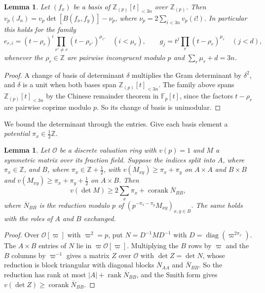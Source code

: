 \documentclass[11pt]{amsart}
\newtheorem{lemma}[theorem]{Lemma}
\theoremstyle{definition}
\theoremstyle{remark}
\numberwithin{equation}{section}
\newcommand{\Z}{\mathbb Z}
\newcommand{\F}{\mathbb F}
\newcommand{\cO}{\mathcal O}
\begin{document}
\begin{lemma}\label{lem:gram}
Let $(f_x)$ be a basis of $\Z_{(p)}[t]_{<3n}$ over $\Z_{(p)}$. Then
$v_p(J_n)=v_p\det[B(f_x,f_y)]-\nu_p$, where $\nu_p=2\sum_{i<3n}v_p(i!)$. In particular this holds for
the family
\[
 e_{r,i}=(t-\rho_r)^i\prod_{r'\ne r}(t-\rho_{r'})^{\mu_{r'}}\quad(i<\mu_r),\qquad g_j=t^j\prod_{r}(t-\rho_r)^{\mu_r}\quad(j<d),
\]
whenever the $\rho_r\in\Z$ are pairwise incongruent modulo $p$ and $\sum_r\mu_r+d=3n$.
\end{lemma}

\begin{proof}
A change of basis of determinant $\delta$ multiplies the Gram determinant by $\delta^2$, and $\delta$ is a unit when
both bases span $\Z_{(p)}[t]_{<3n}$. The family above spans $\Z_{(p)}[t]_{<3n}$ by the Chinese remainder theorem in
$\F_p[t]$, since the factors $t-\rho_r$ are pairwise coprime modulo $p$. So its change of basis is unimodular.
\end{proof}

We bound the determinant through the entries. Give each basis element a \emph{potential} $\pi_x\in\frac12\Z$.

\begin{lemma}\label{lem:halfint}
Let $\cO$ be a discrete valuation ring with $v(p)=1$ and $M$ a symmetric matrix over its fraction field. Suppose the
indices split into $A$, where $\pi_x\in\Z$, and $B$, where $\pi_x\in\Z+\frac12$, with $v(M_{xy})\ge\pi_x+\pi_y$ on
$A\times A$ and $B\times B$ and $v(M_{xy})\ge\pi_x+\pi_y+\frac12$ on $A\times B$. Then
\[
 v(\det M)\ge2\sum_x\pi_x+\operatorname{corank}\overline N_{BB},
\]
where $\overline N_{BB}$ is the reduction modulo $p$ of $(p^{-\pi_x-\pi_y}M_{xy})_{x,y\in B}$. The same holds with
the roles of $A$ and $B$ exchanged.
\end{lemma}

\begin{proof}
Over $\cO[\varpi]$ with $\varpi^2=p$, put $N=D^{-1}MD^{-1}$ with $D=\operatorname{diag}(\varpi^{2\pi_x})$. The
$A\times B$ entries of $N$ lie in $\varpi\cO[\varpi]$. Multiplying the $B$ rows by $\varpi$ and the $B$ columns by
$\varpi^{-1}$ gives a matrix $Z$ over $\cO$ with $\det Z=\det N$, whose reduction is block triangular with diagonal
blocks $\overline N_{AA}$ and $\overline N_{BB}$. So the reduction has rank at most $|A|+\operatorname{rank}\overline N_{BB}$,
and the Smith form gives $v(\det Z)\ge\operatorname{corank}\overline N_{BB}$.
\end{proof}
\end{document}
